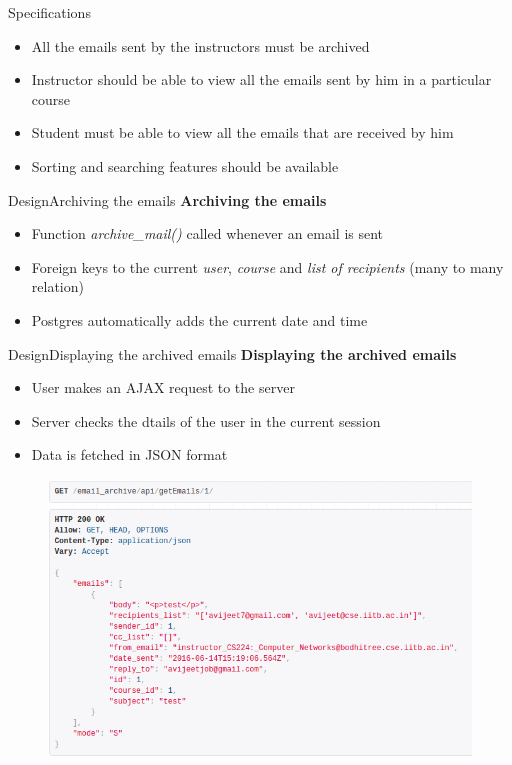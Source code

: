 \documentclass[xcolor=table]{beamer}
\begin{document}
\begin{frame}{Specifications}
	\begin{itemize}
		\item All the emails sent by the instructors must be archived
		\item Instructor should be able to view all the emails sent by him in a particular course
		\item Student must be able to view all the emails that are received by him
		\item Sorting and searching features should be available
	\end{itemize}
\end{frame}

\begin{frame}{Design}{Archiving the emails}
	\textbf{Archiving the emails}
	\begin{itemize}
		\item Function \textit{archive\_mail()} called whenever an email is sent
		\item Foreign keys to the current \textit{user}, \textit{course} and \textit{list of recipients} (many to many relation)
		\item Postgres automatically adds the current date and time
	\end{itemize}
\end{frame}

\begin{frame}{Design}{Displaying the archived emails}
	\textbf{Displaying the archived emails}
	\begin{itemize}
		\item User makes an AJAX request to the server
		\item Server checks the dtails of the user in the current session 
		\item Data is fetched in JSON format
	\end{itemize}
	\begin{figure}
		\centering
		\includegraphics[width=0.6\linewidth]{media/email_json} \\
		\label{fig:email_json}
	\end{figure}
\end{frame}
\end{document}
